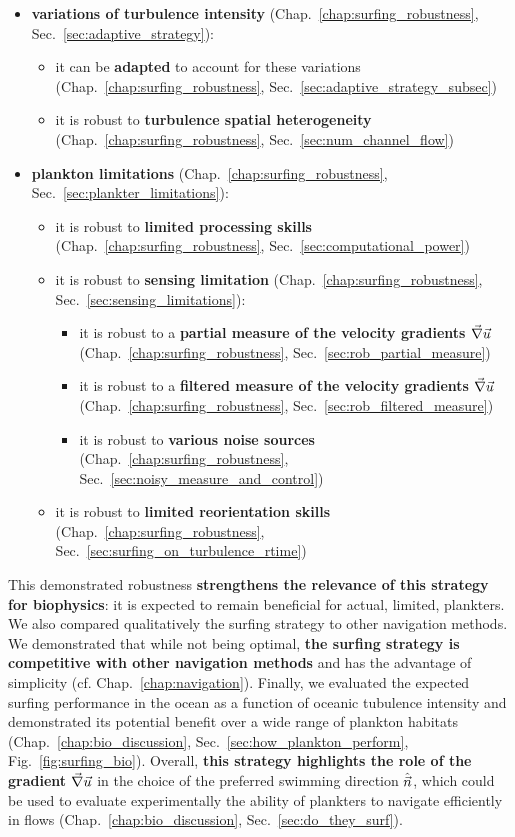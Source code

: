 \begin{itemize}
	\item \textbf{variations of turbulence intensity} (Chap.~\ref{chap:surfing_robustness}, Sec.~\ref{sec:adaptive_strategy}):
		\begin{itemize}
			\item it can be \textbf{adapted} to account for these variations (Chap.~\ref{chap:surfing_robustness}, Sec.~\ref{sec:adaptive_strategy_subsec})
			\item it is robust to \textbf{turbulence spatial heterogeneity} (Chap.~\ref{chap:surfing_robustness}, Sec.~\ref{sec:num_channel_flow})
		\end{itemize}
	\item \textbf{plankton limitations} (Chap.~\ref{chap:surfing_robustness}, Sec.~\ref{sec:plankter_limitations}):
		\begin{itemize}
			\item it is robust to \textbf{limited processing skills} (Chap.~\ref{chap:surfing_robustness}, Sec.~\ref{sec:computational_power})
			\item it is robust to \textbf{sensing limitation} (Chap.~\ref{chap:surfing_robustness}, Sec.~\ref{sec:sensing_limitations}):
				\begin{itemize}
					\item it is robust to a \textbf{partial measure of the velocity gradients $\vec{\nabla} \vec{u}$} (Chap.~\ref{chap:surfing_robustness}, Sec.~\ref{sec:rob_partial_measure})
					\item it is robust to a \textbf{filtered measure of the velocity gradients $\vec{\nabla} \vec{u}$} (Chap.~\ref{chap:surfing_robustness}, Sec.~\ref{sec:rob_filtered_measure})
					\item it is robust to \textbf{various noise sources} (Chap.~\ref{chap:surfing_robustness}, Sec.~\ref{sec:noisy_measure_and_control})
				\end{itemize}
			\item it is robust to \textbf{limited reorientation skills} (Chap.~\ref{chap:surfing_robustness}, Sec.~\ref{sec:surfing_on_turbulence_rtime})
		\end{itemize}
\end{itemize}
This demonstrated robustness \textbf{strengthens the relevance of this strategy for biophysics}: it is expected to remain beneficial for actual, limited, plankters.
We also compared qualitatively the surfing strategy to other navigation methods.
We demonstrated that while not being optimal, \textbf{the surfing strategy is competitive with other navigation methods} and has the advantage of simplicity (cf. Chap.~\ref{chap:navigation}).
Finally, we evaluated the expected surfing performance in the ocean as a function of oceanic tubulence intensity and demonstrated its potential benefit over a wide range of plankton habitats (Chap.~\ref{chap:bio_discussion}, Sec.~\ref{sec:how_plankton_perform}, Fig.~\ref{fig:surfing_bio}).
Overall, \textbf{this strategy highlights the role of the gradient $\vec{\nabla} \vec{u}$} in the choice of the preferred swimming direction $\hat{\vec{n}}$, which could be used to evaluate experimentally the ability of plankters to navigate efficiently in flows (Chap.~\ref{chap:bio_discussion}, Sec.~\ref{sec:do_they_surf}).

